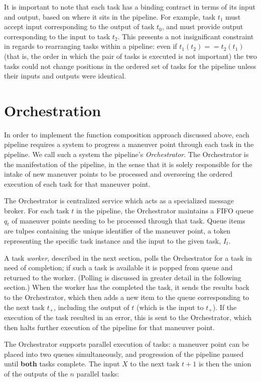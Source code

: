 It is important to note that each task has a binding contract in terms of its input and output, based on where it sits in the pipeline. For example, task $t_1$ must accept input corresponding to the output of task $t_0$, and must provide output corresponding to the input to task $t_2$. This presents a not insignificant constraint in regards to rearranging tasks within a pipeline: even if $t_1(t_2) == t_2(t_1)$ (that is, the order in which the pair of tasks is executed is not important) the two tasks could not change positions in the ordered set of tasks for the pipeline unless their inputs and outputs were identical. 

\section{Orchestration}\label{sec:arch:orchestration}
In order to implement the function composition approach discussed above, each pipeline requires a system to progress a maneuver point through each task in the pipeline. We call such a system the pipeline’s \textit{Orchestrator}. The Orchestrator is the manifestation of the pipeline, in the sense that it is solely responsible for the intake of new maneuver points to be processed and overseeing the ordered execution of each task for that maneuver point.

The Orchestrator is centralized service which acts as a specialized message broker. For each task $t$ in the pipeline, the Orchestrator maintains a FIFO queue $q_t$ of maneuver points needing to be processed through that task. Queue items are tulpes containing the unique identifier of the maneuver point, a token representing the specific task instance and the input to the given task, $I_t$.

A task \textit{worker}, described in the next section, polls the Orchestrator for a task in need of completion; if such a task is available it is popped from queue and returned to the worker. (Polling is discussed in greater detail in the following section.) When the worker has the completed the task, it sends the results back to the Orchestrator, which then adds a new item to the queue corresponding to the next task $t_+$, including the output of $t$ (which is the input to $t_+$). If the execution of the task resulted in an error, this is sent to the Orchestrator, which then halts further execution of the pipeline for that maneuver point.

The Orchestrator supports parallel execution of tasks: a maneuver point can be placed into two queues simultaneously, and progression of the pipeline paused until \textbf{both} tasks complete. The input $X$ to the next task $t+1$ is then the union of the outputs of the $n$ parallel tasks:

